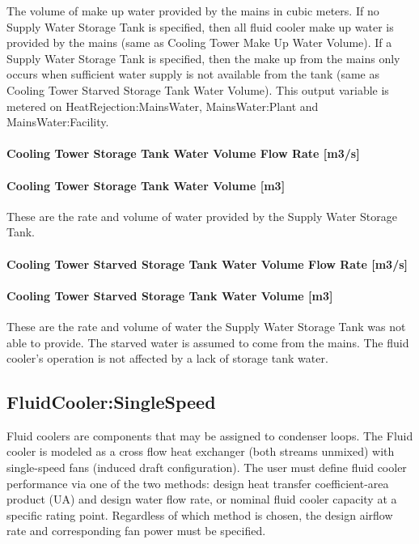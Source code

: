 The volume of make up water provided by the mains in cubic meters. If no Supply Water Storage Tank is specified, then all fluid cooler make up water is provided by the mains (same as Cooling Tower Make Up Water Volume). If a Supply Water Storage Tank is specified, then the make up from the mains only occurs when sufficient water supply is not available from the tank (same as Cooling Tower Starved Storage Tank Water Volume). This output variable is metered on HeatRejection:MainsWater, MainsWater:Plant and MainsWater:Facility.

\paragraph{Cooling Tower Storage Tank Water Volume Flow Rate {[}m3/s{]}}\label{cooling-tower-storage-tank-water-volume-flow-rate-m3s-5}

\paragraph{Cooling Tower Storage Tank Water Volume {[}m3{]}}\label{cooling-tower-storage-tank-water-volume-m3-5}

These are the rate and volume of water provided by the Supply Water Storage Tank.

\paragraph{Cooling Tower Starved Storage Tank Water Volume Flow Rate {[}m3/s{]}}\label{cooling-tower-starved-storage-tank-water-volume-flow-rate-m3s-5}

\paragraph{Cooling Tower Starved Storage Tank Water Volume {[}m3{]}}\label{cooling-tower-starved-storage-tank-water-volume-m3-5}

These are the rate and volume of water the Supply Water Storage Tank was not able to provide. The starved water is assumed to come from the mains. The fluid cooler's operation is not affected by a lack of storage tank water.

\subsection{FluidCooler:SingleSpeed}\label{fluidcoolersinglespeed}

Fluid coolers are components that may be assigned to condenser loops. The Fluid cooler is modeled as a cross flow heat exchanger (both streams unmixed) with single-speed fans (induced draft configuration). The user must define fluid cooler performance via one of the two methods: design heat transfer coefficient-area product (UA) and design water flow rate, or nominal fluid cooler capacity at a specific rating point. Regardless of which method is chosen, the design airflow rate and corresponding fan power must be specified.

